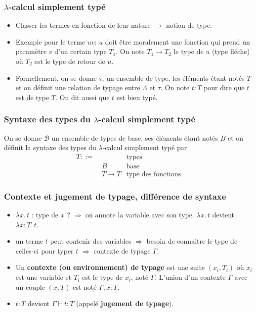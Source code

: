 \documentclass{beamer}
\newcommand{\lambdaExpr}[2]{\lambda #1 . \, #2}
\begin{document}
\begin{frame}
  \frametitle{$\lambda$-calcul simplement typé}
  \begin{itemize}
    \item Classer les termes en fonction de leur nature $\rightarrow$ notion de type.
    \item Exemple pour le terme $uv$: $u$ doit être moralement une fonction qui prend un
      paramètre $v$ d'un certain type $T_{1}$. On note $T_{1} \rightarrow T_{2}$ le
      type de $u$ (type fléche) où $T_{2}$ est le type de retour de $u$.
    \item Formellement, on se donne $\tau$, un ensemble de type, les éléments
      étant notés $T$ et on définit une relation de typage
      entre $\Lambda$ et $\tau$. On note $t : T$ pour dire que $t$ est de type
      $T$. On dit aussi que $t$ est bien typé.
  \end{itemize}
\end{frame}

\begin{frame}
  \frametitle{Syntaxe des types du $\lambda$-calcul simplement typé}
  On se donne $\mathcal{B}$ un ensemble de types de base, ses éléments étant notés
  $B$ et on définit la syntaxe des types du $\lambda$-calcul simplement typé par
  \begin{align*}
    T ::= & \, & \text{types} \\
          & \; B & \text{base} \\
          & \; T \rightarrow T & \text{type des fonctions}
  \end{align*}
\end{frame}

\begin{frame}
  \frametitle{Contexte et jugement de typage, différence de syntaxe}
  \begin{itemize}
  \item $\lambdaExpr{x}{t}$ : type de $x$ ? $\Rightarrow$ on annote la variable
    avec son type. $\lambdaExpr{x}{t}$ devient $\lambdaExpr{x : T}{t}$.
  \item un terme $t$ peut contenir des variables $\Rightarrow$ besoin de
    connaitre le type de celles-ci pour typer $t$ $\Rightarrow$ contexte de
    typage $\Gamma$.
  \item Un \textbf{contexte (ou environnement) de typage} est une suite $(x_{i}, T_{i})$ où $x_{i}$ est une
    variable et $T_{i}$ est le type de $x_{i}$, noté $\Gamma$. L'union d'un
    contexte $\Gamma$ avec un couple $(x, T)$ est noté $\Gamma, x : T$.
  \item $t : T$ devient $\Gamma \vdash t : T$ (appelé \textbf{jugement de typage}).
  \end{itemize}
\end{frame}
\end{document}
